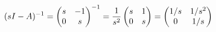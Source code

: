 \documentclass[preview]{standalone}
\begin{document}
\begin{align*}
\special{dvisvgm:raw <g id='unique000'>}(sI-A)^{-1}=\begin{pmatrix}s&-1\\0&s\end{pmatrix}^{-1}=\dfrac{1}{s^2}\begin{pmatrix}s&1\\0&s\end{pmatrix}=\begin{pmatrix}1/s&1/s^2\\0&1/s\end{pmatrix}\special{dvisvgm:raw </g>}
\end{align*}
\end{document}
